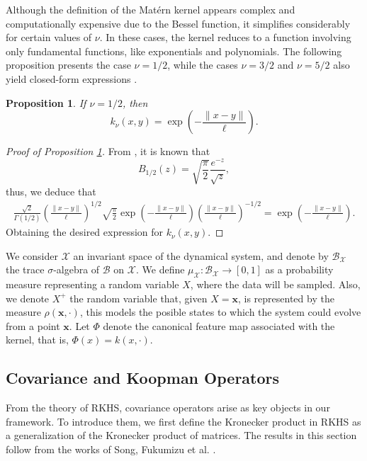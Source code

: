 \documentclass{article}
\newtheorem{prop}{Proposition}
\newcommand{\B}{\mathcal{B}}
\newcommand{\X}{\mathcal{X}}
\begin{document}
Although the definition of the Matérn kernel appears complex and computationally expensive due to the Bessel function, it simplifies considerably for certain values of \( \nu \). In these cases, the kernel reduces to a function involving only fundamental functions, like exponentials and polynomials. The following proposition presents the case \( \nu = 1/2 \), while the cases \( \nu = 3/2 \) and \( \nu = 5/2 \) also yield closed-form expressions \cite{Porcu2024TheLearning}.

\begin{prop} \label{prop:laplace_kernel}
If \( \nu = 1/2 \), then
\[
k_\nu (x, y) = \exp \left( -\frac{\|x - y\|}{\ell} \right).
\]
\end{prop}

\begin{proof}[Proof of Proposition \ref{prop:laplace_kernel}]
From \cite{Barton1965HandbookTables., Davis1944AFunctions}, it is known that
\[
B_{1/2}(z) = \sqrt{ \frac{\pi}{2} } \frac{e^{-z}}{\sqrt{z}},
\]
thus, we deduce that
\[
\begin{aligned}
\frac{\sqrt{2}}{\Gamma(1/2)} \left( \frac{\|x - y\|}{\ell} \right)^{1/2} \sqrt{ \frac{\pi}{2} } \exp \left( -\frac{\|x - y\|}{\ell} \right) \left( \frac{\|x - y\|}{\ell} \right)^{-1/2} = \exp \left( -\frac{\|x - y\|}{\ell} \right).
\end{aligned}
\]
Obtaining the desired expression for \(k_\nu(x, y) \).
\end{proof}

We consider \( \X \) an invariant space of the dynamical system, and denote by \( \B_\X \) the trace \( \sigma \)-algebra of \( \B \) on \( \X \). We define \( \mu_\X: \B_\X \to [0,1] \) as a probability measure representing a random variable \( X \), where the data will be sampled. Also, we denote $X^+$ the random variable that, given $X = \mathbf{x}$, is represented by the measure $\rho(\mathbf{x}, \cdot)$, this models the posible states to which the system could evolve from a point $\mathbf{x}$. Let \( \Phi \) denote the canonical feature map associated with the kernel, that is, \( \Phi(x) = k(x, \cdot) \).

\subsection{Covariance and Koopman Operators}

From the theory of RKHS, covariance operators arise as key objects in our framework. To introduce them, we first define the Kronecker product in RKHS as a generalization of the Kronecker product of matrices. The results in this section follow from the works of Song, Fukumizu et al. \cite{Fukumizu2004DimensionalitySpaces, Fukumizu2013KernelKernels, Fukumizu2015NonparametricEmbedding, Song2009HilbertSystems, Song2013KernelModels}.
\end{document}
